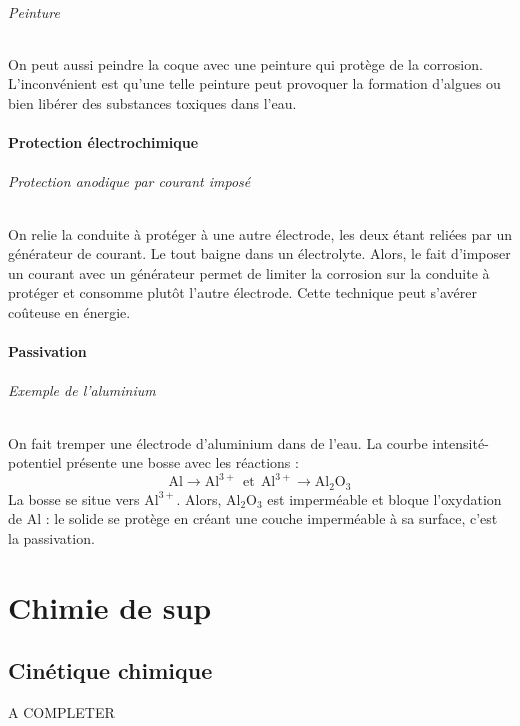 \documentclass[french]{book}
\theoremstyle{plain}
\theoremstyle{definition}
\theoremstyle{remark}
\begin{document}
\paragraph{Peinture} On peut aussi peindre la coque avec une peinture qui protège de la corrosion. L'inconvénient est qu'une telle peinture peut provoquer la formation d'algues ou bien libérer des substances toxiques dans l'eau.

\subsection{Protection électrochimique}

\paragraph{Protection anodique par courant imposé} On relie la conduite à protéger à une autre électrode, les deux étant reliées par un générateur de courant. Le tout baigne dans un électrolyte. Alors, le fait d'imposer un courant avec un générateur permet de limiter la corrosion sur la conduite à protéger et consomme plutôt l'autre électrode. Cette technique peut s'avérer coûteuse en énergie.

\subsection{Passivation}

\paragraph{Exemple de l'aluminium} On fait tremper une électrode d'aluminium dans de l'eau. La courbe intensité-potentiel présente une bosse avec les réactions : $$\text{Al}\to\text{Al}^{3+}\ \ \text{et}\ \ \text{Al}^{3+}\to\text{Al}_2\text{O}_3$$ La bosse se situe vers $\text{Al}^{3+}$. Alors, $\text{Al}_2\text{O}_3$ est imperméable et bloque l'oxydation de $\text{Al}$ : le solide se protège en créant une couche imperméable à sa surface, c'est la passivation.

\part{Chimie de sup}

\chapter{Cinétique chimique}
A COMPLETER
\localtableofcontents
\end{document}
